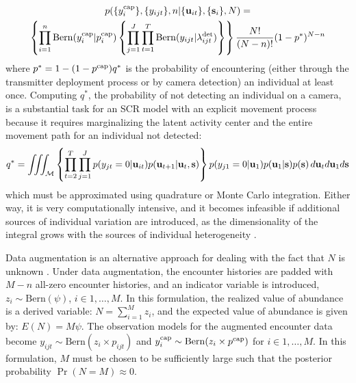 \documentclass[12pt]{article}
\newcommand{\bs}{{\bf s}}
\newcommand{\bu}{{\bf u}}
\newcommand{\but}{{\bf u}_{t}}
\newcommand{\buit}{{\bf u}_{it}}
\begin{document}
\begin{multline}
  p(\{ y_i^{\rm cap}\},\{ y_{ijt}\},n|\{\bu_{it}\}, \{\bs_i\}, N) = \\
  \left\{
  \prod_{i=1}^n
    \mathrm{Bern}(y_i^{\rm cap}|p^{\rm cap}_i) \left\{\prod_{j=1}^J\prod_{t=1}^T
  \mathrm{Bern}(y_{ijt}|\lambda^{\rm det}_{ijt}) \right\}\right\} \frac{N!}{(N-n)!} (1-p^*)^{N-n}
  \label{eq:multinom}
\end{multline}
where $p^*=1-(1-p^{\rm cap})q^*$ is the probability of encountering (either through the
transmitter deployment process or by camera detection) an individual
at least once. Computing $q^*$, the probability of not detecting an
individual on a camera, is a substantial task for an SCR model
with an explicit movement process because it requires marginalizing
the latent activity center and the entire movement path for an
individual not detected:
\begin{equation}
  q^* = \iiint_{\mathcal{M}} \left\{\prod_{t=2}^T \prod_{j=1}^J
    p(y_{jt}=0|\buit)p(\bu_{t+1}|\bu_{t},\bs)\right\}p(y_{j1}=0|\bu_{1})p(\bu_1|\bs)p(\bs)
  \, d\but d\bu_1 d\bs
  \label{eq:q-star}
\end{equation}
which must be approximated using quadrature or Monte Carlo
integration. Either way, it is very computationally intensive, and it
becomes infeasible if additional sources of individual variation are
introduced, as the dimensionality of the integral grows with
the sources of individual heterogeneity \citep{king_etal:2016}. 

Data augmentation is an alternative approach for dealing with the fact
that $N$ is unknown \citep{royle_etal:2007}. Under data augmentation,
the encounter histories  are padded with $M-n$ all-zero encounter
histories, and an indicator variable is introduced,
$z_i \sim \mathrm{Bern}(\psi)$, $i \in 1, \dots, M$. In this
formulation, the realized value of abundance is a derived variable:
$N = \sum_{i=1}^M z_i$, and the
expected value of abundance is given by: $E(N) = M\psi$.  
The observation models for the augmented encounter data become
$y_{ijt} \sim \mathrm{Bern}(z_i \times p_{ijt})$ and
$y^{\rm cap}_{i} \sim \mathrm{Bern}(z_i \times p^{\rm cap})$ for
$i \in 1, \dots, M$. In this formulation, $M$ must be chosen to be
sufficiently large such that the posterior probability
$\Pr(N=M) \approx 0$. 
\end{document}
